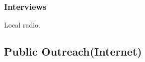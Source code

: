 \documentclass[12pt,english]{scrartcl}
\begin{document}
\subsubsection{Interviews}
\begin{refsection}
	Local radio.	
		
	\nocite{*}
	\printbibliography[filter=press]
\end{refsection} 

\begin{comment}

\raggedright\vspace{2mm}\textbf{Activity}
\begin{itemize}
\item Presentations \cite{moore2018building2,blas2018protecting,deloso2018parasitoid,moore2018freecell,moore2018coconut,moore2018biological2,moore2018freecell2,marshall2018progress,moore2018attempted,moore2017impactof,moore2018biological,moore2018building,moore2017invasion,moore2017coconut,moore2017usingfree,moore2017accessto,moore2017biological,moore2017thecoconut,moore2017biological2,moore2017biological3}
\item Workshops \cite{berringer2018sixteenth,moore2017bringyour,moore2018cnasworkshop,quitugua20182018coconut}
\item Press \cite{moore2018special,varietyuogseeks,pacific2018scientists,2018viralcontrol,postnewtree,leonguerrero2018interview,2018g2ghuman,2017tracking}
\end{itemize}
\raggedright\vspace{2mm}\textbf{Reference(s)}

\begin{btSect}[vancouver]{zotero}
\btPrintCited
\end{btSect}
\newpage{}
\end{btUnit}

\begin{btUnit}

\end{comment}

\subsection{Public Outreach(Internet)}
\end{document}
